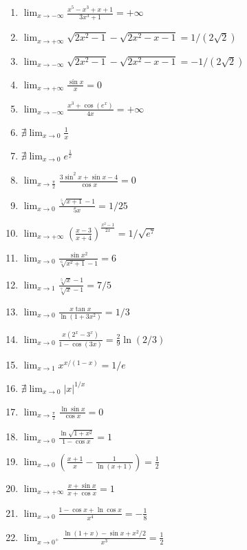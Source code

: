 \documentclass[11pt,a4paper]{article}
\begin{document}
\begin{enumerate}
\item $\displaystyle \lim_{x \to -\infty} \frac{x^{5} - x^{3} + x + 1}{3x^{3} + 1} = +\infty$
\item $\displaystyle \lim_{x \to +\infty} \sqrt{2x^{2} - 1} - \sqrt{2x^{2} - x - 1} = 1/(2\sqrt{2})$
\item $\displaystyle \lim_{x \to -\infty} \sqrt{2x^{2} - 1} - \sqrt{2x^{2} - x - 1} = -1/(2\sqrt{2})$
\item $\displaystyle \lim_{x \to +\infty} \frac{\sin x}{x} = 0$
\item $\displaystyle \lim_{x \to -\infty} \frac{x^{3} + \cos(e^{x})}{4x} = +\infty$
\item $\displaystyle \nexists \lim_{x \to 0} \frac{1}{x}$
\item $\displaystyle \nexists \lim_{x \to 0} e^{\frac{1}{x}}$
\item $\displaystyle \lim_{x \to \frac{\pi}{2}} \frac{3\sin^{2} x + \sin x - 4}{\cos x} = 0$
\item $\displaystyle \lim_{x \to 0} \frac{\sqrt[5]{x + 1} - 1}{5x} = 1/25$
\item $\displaystyle \lim_{x \to +\infty} \left(\frac{x - 3}{x + 4}\right)^{\frac{x^{2} - 1}{2x}} = 1/\sqrt{e^{7}}$
\item $\displaystyle \lim_{x \to 0} \frac{\sin x^{2}}{\sqrt[6]{x^{2} + 1} - 1} = 6$
\item $\displaystyle \lim_{x \to 1} \frac{\sqrt[5]{x} - 1}{\sqrt[7]{x} - 1} = 7/5$
\item $\displaystyle \lim_{x \to 0} \frac{x\tan x}{\ln(1 + 3x^{2})} = 1/3$
\item $\displaystyle \lim_{x \to 0} \frac{x(2^{x} - 3^{x})}{1 - \cos(3x)} = \frac{2}{9}\ln(2/3)$
\item $\displaystyle \lim_{x \to 1} x^{x/(1 - x)} = 1/e$
\item $\displaystyle \nexists \lim_{x \to 0} \left|x\right|^{1/x}$
\item $\displaystyle \lim_{x \to \frac{\pi}{2}} \frac{\ln\sin x}{\cos x} = 0$
\item $\displaystyle \lim_{x \to 0} \frac{\ln\sqrt{1 + x^{2}}}{1 - \cos x} = 1$
\item $\displaystyle \lim_{x \to 0} \left(\frac{x + 1}{x} - \frac{1}{\ln(x + 1)}\right) = \frac{1}{2}$
\item $\displaystyle \lim_{x \to +\infty} \frac{x + \sin x}{x + \cos x} = 1$
\item $\displaystyle \lim_{x \to 0} \frac{1 - \cos x + \ln\cos x}{x^{4}} = -\frac{1}{8}$
\item $\displaystyle \lim_{x \to 0^{+}} \frac{\ln(1 + x) - \sin x + x^{2}/2}{x^{3}} = \frac{1}{2}$

\end{enumerate}
\end{document}
